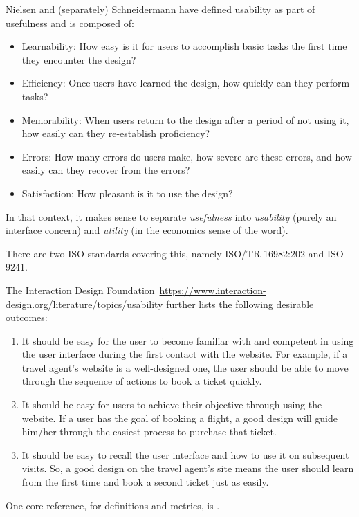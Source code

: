 \documentclass[letterpaper,cleveref]{lipics-v2019}
\theoremstyle{definition}
\begin{document}
Nielsen and (separately) Schneidermann have defined usability as part of
usefulness and
is composed of:
\begin{itemize}
	\item Learnability: How easy is it for users to accomplish basic tasks the
	first time they encounter the design?
	\item Efficiency: Once users have learned the design, how quickly can they
	perform tasks?
	\item Memorability: When users return to the design after a period of not using
	it, how easily can they re-establish proficiency?
	\item Errors: How many errors do users make, how severe are these errors, and
	how easily can they recover from the errors?
	\item Satisfaction: How pleasant is it to use the design?
\end{itemize}
In that context, it makes sense to separate \emph{usefulness} into
\emph{usability} (purely an interface concern) and \emph{utility} (in the
economics
sense of the word).

There are two ISO standards covering this, namely ISO/TR 16982:202 and ISO 9241.


The Interaction Design
Foundation~\url{https://www.interaction-design.org/literature/topics/usability}
further lists the following desirable outcomes:

\begin{enumerate}
	\item It should be easy for the user to become familiar with and competent in
	using
	the user interface during the first contact with the website. For example, if a
	travel agent’s website is a well-designed one, the user should be able to move
	through the sequence of actions to book a ticket quickly.
	\item It should be easy for users to achieve their objective through using the
	website. If a user has the goal of booking a flight, a good design will guide
	him/her through the easiest process to purchase that ticket.
	\item It should be easy to recall the user interface and how to use it on
	subsequent visits. So, a good design on the travel agent’s site means the user
	should learn from the first time and book a second ticket just as easily.
\end{enumerate}

One core reference, for definitions and metrics, is
\citet{bevan1995measuring}.
\end{document}
